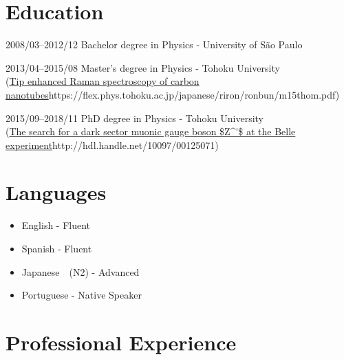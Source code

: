 \documentclass[a4paper]{article}
\begin{document}
\section{Education}
\begin{CV}
\item[2008/03--2012/12] Bachelor degree in Physics - University of São Paulo
\item[2013/04--2015/08] Master's degree in Physics - Tohoku University \\
  \hspace*{-2cm} (\url{Tip enhanced Raman spectroscopy of carbon nanotubes}{https://flex.phys.tohoku.ac.jp/japanese/riron/ronbun/m15thom.pdf})
\item[2015/09--2018/11] PhD degree in Physics - Tohoku University \\
  \hspace*{-3cm} (\url{The search for a dark sector muonic gauge boson $Z^'$ at the Belle experiment}{http://hdl.handle.net/10097/00125071})
\end{CV}



\section{Languages}
\begin{itemize}
	\item English - Fluent
	\item Spanish - Fluent
  \item Japanese　(N2) - Advanced
  \item Portuguese - Native Speaker
\end{itemize}
 
 
\section{Professional Experience}
 
\end{document}
